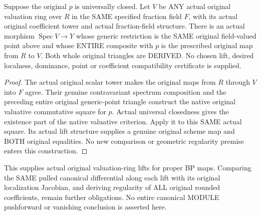 \begin{theorem}
\label{sc0-generic-valuative:actual-whole-lifts}
\leanok
Suppose the original $p$ is universally closed. Let $V$ be ANY
actual original valuation ring over $R$ in the SAME specified
fraction field $F$, with its actual original coefficient tower
and actual fraction-field structure. There is an actual morphism
$\operatorname{Spec}V\to Y$ whose generic restriction is the SAME
original field-valued point above and whose ENTIRE composite with
$p$ is the prescribed original map from $R$ to $V$.
Both whole original triangles are DERIVED. No chosen lift, desired
localness, dominance, point or coefficient compatibility certificate
is supplied.
\end{theorem}
\begin{proof}
The actual original scalar tower makes the original maps from $R$
through $V$ into $F$ agree. Their genuine contravariant spectrum
composition and the preceding entire original generic-point triangle
construct the native original valuative commutative square for
$p$. Actual universal closedness gives the existence part of the
native valuative criterion. Apply it to this SAME actual square.
Its actual lift structure supplies a genuine original scheme map
and BOTH original equalities. No new comparison or geometric
regularity premise enters this construction.
\end{proof}

This supplies actual original valuation-ring lifts for proper BP
maps. Comparing the SAME pulled canonical differential along each
lift with its original localization Jacobian, and deriving regularity
of ALL original rounded coefficients, remain further obligations.
No entire canonical MODULE pushforward or vanishing conclusion is
asserted here.

